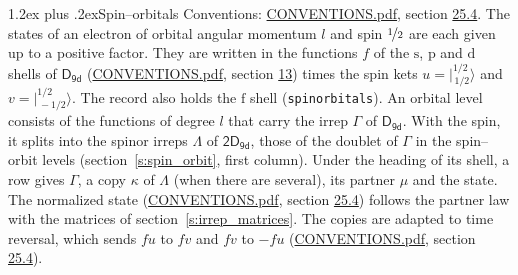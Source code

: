 \documentclass[10pt,a4paper]{article}
\makeatletter
\renewcommand\section{\@startsection{section}{1}{\z@}{-3ex plus -1ex minus -.2ex}%
  {1.2ex plus .2ex}{\normalfont\large\sffamily\bfseries\color{parttitle}}}
\numberwithin{equation}{section}
\newcommand{\grp}[1]{\mathsf{#1}}
\newcommand{\orbital}[1]{\mathrm{#1}}
\newcommand{\mult}{\kappa}
\newcommand{\intx}{\mu}
\newcommand{\jm}[2]{\bigl\lvert{}^{#1}_{\,#2}\bigr\rangle}
\makeatother
\begin{document}
\section{Spin--orbitals}\label{s:spin_orbitals}
Conventions: \href{../../CONVENTIONS.pdf}{CONVENTIONS.pdf}, section \href{../../CONVENTIONS.pdf\#conv.25.4}{25.4}.
\leavevmode\label{n:index.orbital.l}The states of an electron of orbital angular momentum $l$ and spin $\nicefrac{1}{2}$ are each given up to a positive factor. \label{n:local.spinor.uv}\label{n:local.function.f}They are written in the functions $f$ of the $\orbital{s}$, $\orbital{p}$ and $\orbital{d}$ shells of \href{../../../rotation/data/pdf/D9d.pdf}{$\grp{D_{9d}}$} (\href{../../CONVENTIONS.pdf}{CONVENTIONS.pdf}, section \href{../../../rotation/CONVENTIONS.pdf\#conv.13}{13}) times the spin kets $u = \jm{1/2}{1/2}$ and $v = \jm{1/2}{-1/2}$. The record also holds the $\orbital{f}$ shell (\texttt{spinorbitals}). An orbital level consists of the functions of degree $l$ that carry the irrep $\Gamma$ of \href{../../../rotation/data/pdf/D9d.pdf}{$\grp{D_{9d}}$}. With the spin, it splits into the spinor irreps $\Lambda$ of $\grp{2D_{9d}}$, those of the doublet of $\Gamma$ in the spin--orbit levels (section~\ref{s:spin_orbit}, first column). \label{n:head.state}Under the heading of its shell, a row gives $\Gamma$, a copy $\mult$ of $\Lambda$ (when there are several), its partner $\intx$ and the state. The normalized state (\href{../../CONVENTIONS.pdf}{CONVENTIONS.pdf}, section \href{../../CONVENTIONS.pdf\#conv.25.4}{25.4}) follows the partner law with the matrices of section~\ref{s:irrep_matrices}. The copies are adapted to time reversal, which sends $f u$ to $f v$ and $f v$ to $-f u$ (\href{../../CONVENTIONS.pdf}{CONVENTIONS.pdf}, section \href{../../CONVENTIONS.pdf\#conv.25.4}{25.4}).
\end{document}
